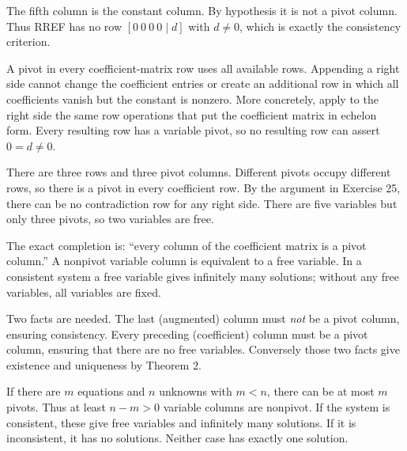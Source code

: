 The fifth column is the constant column. By hypothesis it is not a
pivot column. Thus RREF has no row $[0\ 0\ 0\ 0\mid d]$ with
$d\ne0$, which is exactly the consistency criterion.

A pivot in every coefficient-matrix row uses all available rows.
Appending a right side cannot change the coefficient entries or create
an additional row in which all coefficients vanish but the constant is
nonzero. More concretely, apply to the right side the same row operations
that put the coefficient matrix in echelon form. Every resulting row has
a variable pivot, so no resulting row can assert $0=d\ne0$.

There are three rows and three pivot columns. Different pivots occupy
different rows, so there is a pivot in every coefficient row. By the
argument in Exercise 25, there can be no contradiction row for any right
side. There are five variables but only three pivots, so two variables
are free.

The exact completion is: ``every column of the coefficient matrix is a
pivot column.'' A nonpivot variable column is equivalent to a free
variable. In a consistent system a free variable gives infinitely many
solutions; without any free variables, all variables are fixed.

Two facts are needed. The last (augmented) column must \emph{not} be a
pivot column, ensuring consistency. Every preceding (coefficient) column
must be a pivot column, ensuring that there are no free variables.
Conversely those two facts give existence and uniqueness by Theorem 2.

If there are $m$ equations and $n$ unknowns with $m<n$, there can be
at most $m$ pivots. Thus at least $n-m>0$ variable columns are nonpivot.
If the system is consistent, these give free variables and infinitely
many solutions. If it is inconsistent, it has no solutions. Neither case
has exactly one solution.

